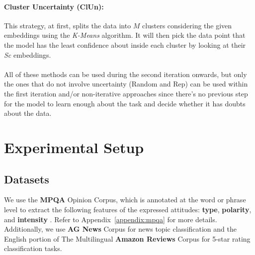 \documentclass[11pt]{article}
\theoremstyle{definition}
\begin{document}
\paragraph{Cluster Uncertainty (ClUn):}
This strategy, at first, splits the data into $M$ clusters considering the given embeddings using the \textit{K-Means} algorithm. It will then pick the data point that the model has the least confidence about inside each cluster by looking at their \textit{Sc} embeddings. 

\paragraph{}
All of these methods can be used during the second iteration onwards, but only the ones that do not involve uncertainty (Random and Rep) can be used within the first iteration and/or non-iterative approaches since there's no previous step for the model to learn enough about the task and decide whether it has doubts about the data.


\section{Experimental Setup} \label{sec:expriments}

\subsection{Datasets} \label{sec:dataset}

We use the \textbf{MPQA} Opinion Corpus, which is annotated at the word or phrase level to extract the following features of the expressed attitudes: \textbf{type}, \textbf{polarity}, and \textbf{intensity} \cite{wiebe2005annotating, wilson2008fine}. Refer to Appendix~\ref{appendix:mpqa} for more details. 
Additionally, we use \textbf{AG News} Corpus \cite{Gulli_2005} for news topic classification and the English portion of The Multilingual \textbf{Amazon Reviews} Corpus \cite{keung-etal-2020-multilingual} for 5-star rating classification tasks.
\end{document}
